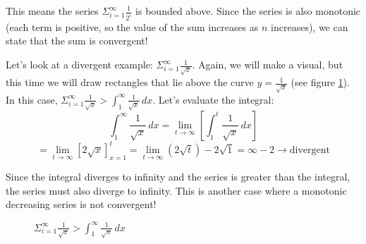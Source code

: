 This means the series $\Sigma_{i = 1}^\infty \frac{1}{2^i}$ is bounded above. 
Since the series is also monotonic (each term is positive, so the value of the 
sum increases as $n$ increases), we can state that the sum is convergent! 

Let's look at a divergent example: $\Sigma_{i = 1}^\infty \frac{1}{\sqrt{x}}$. 
Again, we will make a visual, but this time we will draw rectangles that lie 
above the curve $y = \frac{1}{\sqrt{x}}$ (see figure \ref{fig:invroot}). In 
this case, $\Sigma_{i = 1}^\infty \frac{1}{\sqrt{x}}> \int_1^\infty 
\frac{1}{\sqrt{x}}\,dx$. Let's evaluate the integral:
$$\int_1^\infty \frac{1}{\sqrt{x}}\,dx = \lim_{t \to \infty} \left[ \int_1^t 
\frac{1}{\sqrt{x}}\,dx \right] $$
$$= \lim_{t \to \infty} \left[ 2 \sqrt{x} \right]_{x=1}^t= \lim_{t \to \infty} 
\left( 2\sqrt{t} \right) - 2\sqrt{1} = \infty - 2 \rightarrow \text{divergent}$$

Since the integral diverges to infinity and the series is greater than the 
integral, the series must also diverge to infinity. This is another case where 
a monotonic decreasing series is not convergent!

\begin{figure}[htbp]
    \centering
    \caption{$\Sigma_{i = 1}^\infty \frac{1}{\sqrt{x}}> \int_1^\infty 
    \frac{1}{\sqrt{x}}\,dx$}
    \label{fig:invroot}
\end{figure}

